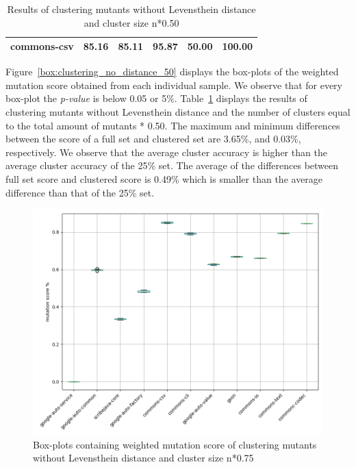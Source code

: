 \documentclass[conference,draftclsnofoot,onecolumn]{IEEEtran}
\begin{document}
\begin{table}[ht]
\begin{tabular}{|l|c|c|c|c|c|}
commons-csv                   & 85.16                                                                                 & 85.11                                                                                     & 95.87                                                                              & 50.00                                                                               & 100.00                                                                             \\ \hline
\end{tabular}
\caption{\label{tab:clustering_no_distance_50}Results of clustering mutants without Levensthein distance and cluster size n*0.50}
\end{table}


Figure~\ref{box:clustering_no_distance_50} displays the box-plots of the weighted mutation score obtained from each individual sample. 
We observe that for every box-plot the \textit{p-value} is below 0.05 or 5\%.
Table~\ref{tab:clustering_no_distance_50} displays the results of clustering mutants without Levensthein distance and the number of clusters equal to the total amount of mutants * 0.50.
The maximum and minimum differences between the score of a full set and clustered set are 3.65\%, and 0.03\%, respectively.
We observe that the average cluster accuracy is higher than the average cluster accuracy of the 25\% set. 
The average of the differences between full set score and clustered score is 0.49\% which is smaller than the average difference than that of the 25\% set.

\begin{figure}[ht]
\includegraphics[width=0.5 \textwidth]{images/boxplot_summary/boxplot_hc_no_distance_0.75.png}
\caption{\label{box:clustering_no_distance_75}Box-plots containing weighted mutation score of clustering mutants without Levensthein distance and cluster size n*0.75}
\end{figure}
\end{document}
